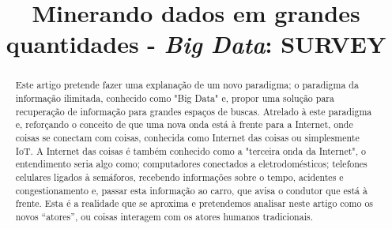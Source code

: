 \documentclass[conference,compsoc]{IEEEtran}
\begin{document}
%
\title{Minerando dados em grandes quantidades - \textit{Big Data}: SURVEY}


\author{
\and
{}
}



\maketitle

\begin{abstract}
Este artigo pretende fazer uma explanação de um novo paradigma; o paradigma da informação ilimitada, conhecido como "Big Data" e, propor uma solução para recuperação de informação para grandes espaços de buscas. Atrelado à este paradigma e, reforçando o conceito de que uma nova onda está à frente para a Internet, onde coisas se conectam com coisas, conhecida como Internet das coisas ou simplesmente IoT. A Internet das coisas é também conhecido como a "terceira onda da Internet", o entendimento seria algo como; computadores conectados a eletrodomésticos; telefones celulares ligados à semáforos, recebendo informações sobre o tempo, acidentes e congestionamento e, passar esta informação ao carro, que avisa o condutor que está à frente. Esta é a realidade que se aproxima e pretendemos analisar neste artigo como os novos ``atores'', ou coisas interagem com os atores humanos tradicionais.
\end{abstract}
\end{document}
